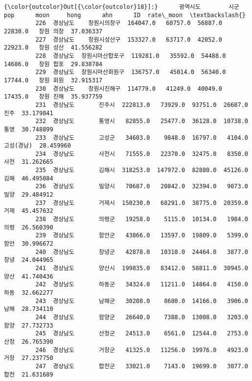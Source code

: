 \documentclass[11pt]{article}
\begin{document}
\begin{Verbatim}[commandchars=\\\{\}]
{\color{outcolor}Out[{\color{outcolor}18}]:}      광역시도        시군       pop      moon     hong      ahn      ID  rate\_moon  \textbackslash{}
         226  경상남도    창원시의창구  164047.0   60757.0  56887.0  22830.0   창원 의창  37.036337   
         227  경상남도    창원시성산구  153327.0   63717.0  42052.0  22923.0   창원 성산  41.556282   
         228  경상남도  창원시마산합포구  119281.0   35592.0  54488.0  14686.0   창원 합포  29.838784   
         229  경상남도  창원시마산회원구  136757.0   45014.0  56340.0  17744.0   창원 회원  32.915317   
         230  경상남도    창원시진해구  114779.0   41249.0  40049.0  17435.0   창원 진해  35.937759   
         231  경상남도       진주시  222813.0   73929.0  93751.0  26687.0      진주  33.179841   
         232  경상남도       통영시   82855.0   25477.0  36128.0  10738.0      통영  30.748899   
         233  경상남도       고성군   34603.0    9848.0  16797.0   4104.0  고성(경남)  28.459960   
         234  경상남도       사천시   71555.0   22370.0  32475.0   8350.0      사천  31.262665   
         235  경상남도       김해시  318253.0  147972.0  82880.0  45126.0      김해  46.495084   
         236  경상남도       밀양시   70687.0   20842.0  32394.0   9073.0      밀양  29.484912   
         237  경상남도       거제시  150230.0   68291.0  38775.0  20359.0      거제  45.457632   
         238  경상남도       의령군   19258.0    5115.0  10134.0   1984.0      의령  26.560390   
         239  경상남도       함안군   43866.0   13597.0  19809.0   5399.0      함안  30.996672   
         240  경상남도       창녕군   42878.0   10310.0  24464.0   3877.0      창녕  24.044965   
         241  경상남도       양산시  199835.0   83412.0  58811.0  30945.0      양산  41.740436   
         242  경상남도       하동군   34324.0   11211.0  14864.0   4150.0      하동  32.662277   
         243  경상남도       남해군   30208.0    8680.0  14166.0   3906.0      남해  28.734110   
         244  경상남도       함양군   26640.0    7388.0  13008.0   3203.0      함양  27.732733   
         245  경상남도       산청군   24513.0    6561.0  12544.0   2753.0      산청  26.765390   
         246  경상남도       거창군   41325.0   11256.0  19976.0   4923.0      거창  27.237750   
         247  경상남도       합천군   33021.0    7143.0  19699.0   3077.0      합천  21.631689   
         

\end{Verbatim}
\end{document}
